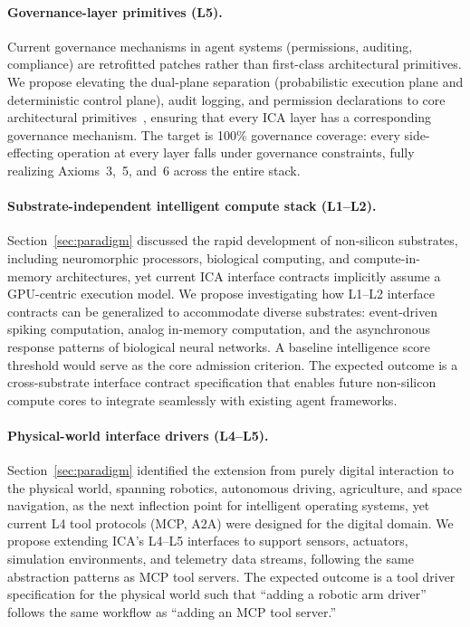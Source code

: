 \paragraph{Governance-layer primitives (L5).}
Current governance mechanisms in agent systems (permissions, auditing, compliance) are retrofitted patches rather than first-class architectural primitives.
We propose elevating the dual-plane separation (probabilistic execution plane and deterministic control plane), audit logging, and permission declarations to core architectural primitives~\cite{arbiteros2025,ironclaw2025}, ensuring that every ICA layer has a corresponding governance mechanism.
The target is 100\% governance coverage: every side-effecting operation at every layer falls under governance constraints, fully realizing Axioms~3,~5, and~6 across the entire stack.

\paragraph{Substrate-independent intelligent compute stack (L1--L2).}
Section~\ref{sec:paradigm} discussed the rapid development of non-silicon substrates, including neuromorphic processors, biological computing, and compute-in-memory architectures, yet current ICA interface contracts implicitly assume a GPU-centric execution model.
We propose investigating how L1--L2 interface contracts can be generalized to accommodate diverse substrates: event-driven spiking computation, analog in-memory computation, and the asynchronous response patterns of biological neural networks.
A baseline intelligence score threshold would serve as the core admission criterion.
The expected outcome is a cross-substrate interface contract specification that enables future non-silicon compute cores to integrate seamlessly with existing agent frameworks.

\paragraph{Physical-world interface drivers (L4--L5).}
Section~\ref{sec:paradigm} identified the extension from purely digital interaction to the physical world, spanning robotics, autonomous driving, agriculture, and space navigation, as the next inflection point for intelligent operating systems, yet current L4 tool protocols (MCP, A2A) were designed for the digital domain.
We propose extending ICA's L4--L5 interfaces to support sensors, actuators, simulation environments, and telemetry data streams, following the same abstraction patterns as MCP tool servers.
The expected outcome is a tool driver specification for the physical world such that ``adding a robotic arm driver'' follows the same workflow as ``adding an MCP tool server.''


